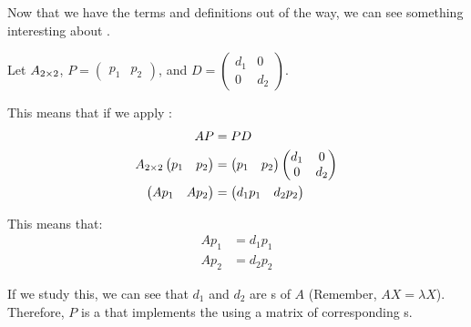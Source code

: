 Now that we have the terms and definitions out of the way, we can see something interesting about .
\begin{blackbox}
  Let $A_{2 \times 2}$, $P =
  \begin{pmatrix}
    p_{1} & p_{2}
  \end{pmatrix}
  $, and $D =
  \begin{pmatrix}
    d_{1} & 0 \\
    0 & d_{2}
  \end{pmatrix}$.

  This means that if we apply :
  \begin{align*}
    AP &= PD \\
    A_{2 \times 2}
    \begin{pmatrix}
      p_{1} & p_{2}
    \end{pmatrix} &=
                    \begin{pmatrix}
                      p_{1} & p_{2}
                    \end{pmatrix}
                              \begin{pmatrix}
                                d_{1} & 0 \\
                                0 & d_{2} \\
                              \end{pmatrix} \\
    \begin{pmatrix}
      A p_{1} & A p_{2}
    \end{pmatrix} &=
                    \begin{pmatrix}
                      d_{1} p_{1} & d_{2} p_{2}
                    \end{pmatrix}
  \end{align*}

  This means that:
  \begin{align*}
    A p_{1} &= d_{1} p_{1} \\
    A p_{2} &= d_{2} p_{2}
  \end{align*}

  If we study this, we can see that $d_{1}$ and $d_{2}$ are s of $A$ (Remember, $AX = \lambda X$).
  Therefore, $P$ is a  that implements the  using a matrix of corresponding s.
\end{blackbox}


